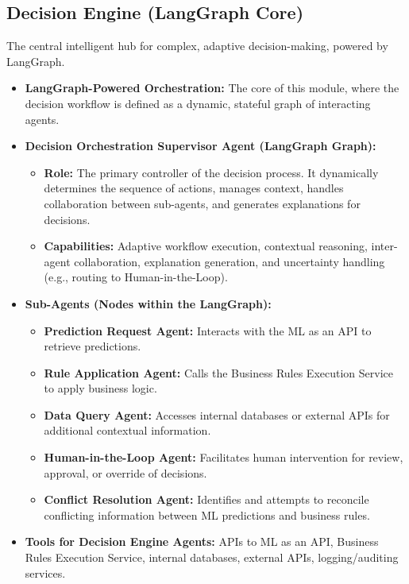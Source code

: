 \documentclass{article}
\begin{document}
\subsection{Decision Engine (LangGraph Core)}
The central intelligent hub for complex, adaptive decision-making, powered by LangGraph.
\begin{itemize}
    \item \textbf{LangGraph-Powered Orchestration:} The core of this module, where the decision workflow is defined as a dynamic, stateful graph of interacting agents.
    \item \textbf{Decision Orchestration Supervisor Agent (LangGraph Graph):}
        \begin{itemize}
            \item \textbf{Role:} The primary controller of the decision process. It dynamically determines the sequence of actions, manages context, handles collaboration between sub-agents, and generates explanations for decisions.
            \item \textbf{Capabilities:} Adaptive workflow execution, contextual reasoning, inter-agent collaboration, explanation generation, and uncertainty handling (e.g., routing to Human-in-the-Loop).
        \end{itemize}
    \item \textbf{Sub-Agents (Nodes within the LangGraph):}
        \begin{itemize}
            \item \textbf{Prediction Request Agent:} Interacts with the ML as an API to retrieve predictions.
            \item \textbf{Rule Application Agent:} Calls the Business Rules Execution Service to apply business logic.
            \item \textbf{Data Query Agent:} Accesses internal databases or external APIs for additional contextual information.
            \item \textbf{Human-in-the-Loop Agent:} Facilitates human intervention for review, approval, or override of decisions.
            \item \textbf{Conflict Resolution Agent:} Identifies and attempts to reconcile conflicting information between ML predictions and business rules.
        \end{itemize}
    \item \textbf{Tools for Decision Engine Agents:} APIs to ML as an API, Business Rules Execution Service, internal databases, external APIs, logging/auditing services.

\end{itemize}
\end{document}
